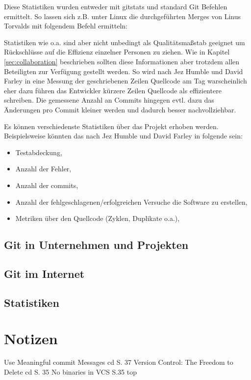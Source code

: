 Diese Statistiken wurden entweder mit gitstats\cite{link:gitstats} und standard
Git Befehlen ermittelt. So lassen sich z.B. unter Linux die durchgeführten
Merges von Linus Torvalds mit folgendem Befehl ermitteln:



Statistiken wie o.a. sind aber nicht unbedingt als Qualitätsmaßstab geeignet um
Rückschlüsse auf die Effizienz einzelner Personen zu ziehen.  Wie in Kapitel
\ref{sec:collaboration} beschrieben sollten diese Informationen aber trotzdem
allen Beteiligten zur Verfügung gestellt werden.  So wird nach Jez Humble und
David Farley in \cite[S.~138]{cd} eine Messung der geschriebenen Zeilen
Quellcode am Tag warscheinlich eher dazu führen das Entwickler kürzere Zeilen
Quellcode als effizientere schreiben. Die gemessene Anzahl an Commits hingegen
evtl. dazu das Änderungen pro Commit kleiner werden und dadurch besser
nachvollziehbar.

Es können verschiedenste Statistiken über das Projekt erhoben werden.
Beispielsweise könnten das nach Jez Humble und David Farley in
\cite[S.~138]{cd}folgende sein:

\begin{itemize}
\item Testabdeckung,
\item Anzahl der Fehler,
\item Anzahl der \glspl{commit},
\item Anzahl der fehlgeschlagenen/erfolgreichen Versuche die Software zu erstellen,
\item Metriken über den Quellcode (Zyklen, Duplikate o.a.),
\end{itemize}


\section{Git in Unternehmen und Projekten}
\section{Git im Internet}
\section{Statistiken}
\chapter{\result}\label{cha:result}

\chapter{Notizen}
Use Meaningful commit Messages cd S. 37
Version Control: The Freedom to Delete cd S. 35
No binaries in VCS S.35 top
